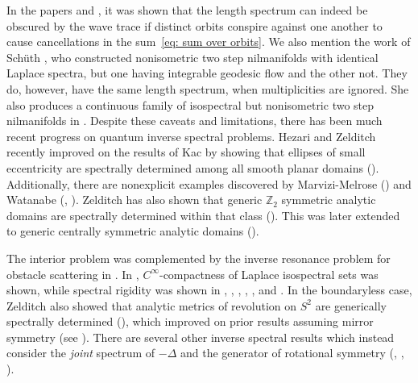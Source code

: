 \documentclass[11pt,letterpaper,oneside]{amsart}
\newcommand{\Z}{\mathbb{Z}}
\theoremstyle{definition}
\theoremstyle{remark}
\theoremstyle{definition}
\theoremstyle{remark}
\begin{document}
In the papers \cite{KKV} and \cite{KV24}, it was shown that the length spectrum can indeed be obscured by the wave trace if distinct orbits conspire against one another to cause cancellations in the sum~\eqref{eq: sum over orbits}. We also mention the work of Schüth \cite{Schueth}, who constructed nonisometric two step nilmanifolds with identical Laplace spectra, but one having integrable geodesic flow and the other not. They do, however, have the same length spectrum, when multiplicities are ignored. She also produces a continuous family of isospectral but nonisometric two step nilmanifolds in \cite{Schueth2}. Despite these {caveats and} limitations, there has been much recent progress on quantum inverse spectral problems. Hezari and Zelditch recently improved on the results of Kac by showing that ellipses of small eccentricity are spectrally determined among all smooth planar domains (\cite{HeZe19}). Additionally, there are nonexplicit examples discovered by Marvizi-Melrose (\cite{MM}) and Watanabe (\cite{Watanabe1}, \cite{Watanabe2}). Zelditch has also shown that generic $\Z_2$ symmetric analytic domains are spectrally determined within that class (\cite{Zel09}). This was later extended to generic centrally symmetric analytic domains (\cite{HezariZelditchCentrallySymmetric}).

\medskip

The interior problem was complemented by the inverse resonance problem for obstacle scattering in \cite{Zel0res}. In \cite{MelroseIsospectralCompactness, POS1, POS2}, $C^\infty$-compactness of Laplace isospectral sets was shown, while spectral rigidity was shown in \cite{HeZe12}, \cite{Zelditch5}, \cite{Vig21}, \cite{PopTop12}, \cite{PopovTopalovKAM}, and \cite{HezariZelditchEigenfunctionAsymptotics}. In the boundaryless case, Zelditch also showed that analytic metrics of revolution on $S^2$ are generically spectrally determined (\cite{Zelditch2}), which improved on prior results assuming mirror symmetry (see \cite{BruningHeintze}). There are several other inverse spectral results which instead consider the \textit{joint} spectrum of $-\Delta$ and the generator of rotational symmetry (\cite{BerardSOR}, \cite{Gurarie}, \cite{KacReflection}). 

\medskip
\end{document}
